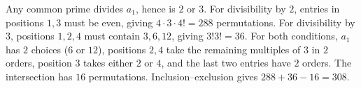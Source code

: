 Any common prime divides $a_1$, hence is $2$ or $3$. For divisibility by $2$, entries in positions $1,3$ must be even, giving $4\cdot3\cdot4!=288$ permutations. For divisibility by $3$, positions $1,2,4$ must contain $3,6,12$, giving $3!3!=36$. For both conditions, $a_1$ has $2$ choices ($6$ or $12$), positions $2,4$ take the remaining multiples of $3$ in $2$ orders, position $3$ takes either $2$ or $4$, and the last two entries have $2$ orders. The intersection has $16$ permutations. Inclusion--exclusion gives $288+36-16=\boxed{308}$.
